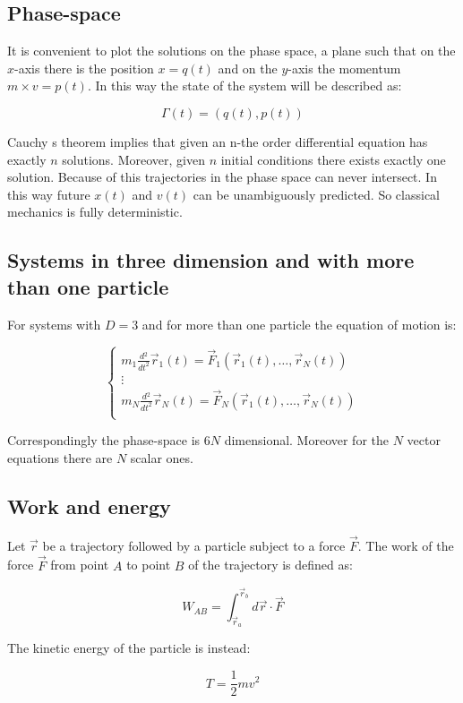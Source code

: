  \subsection{Phase-space}
  It is convenient to plot the solutions on the phase space, a plane such that on the $x$-axis there is the position $x=q(t)$ and on the $y$-axis the momentum $m\times v=p(t)$.
  In this way the state of the system will be described as:

  $$\Gamma(t) = (q(t),p(t))$$

  Cauchy s theorem implies that given an n-the order differential equation has exactly $n$ solutions.
  Moreover, given $n$ initial conditions there exists exactly one solution.
  Because of this trajectories in the phase space can never intersect.
  In this way future $x(t)$ and $v(t)$ can be unambiguously predicted.
  So classical mechanics is fully deterministic.

  \subsection{Systems in three dimension and with more than one particle}
  For systems with $D=3$ and for more than one particle the equation of motion is:

  $$\begin{cases}
    m_1 \frac{d{^2}}{d{t^2}}\vec{r}_1(t) = \vec{F}_1(\vec{r}_1(t), \dots,\vec{r}_N(t))\\
    \vdots\\
    m_N \frac{d{^2}}{d{t^2}}\vec{r}_N(t) = \vec{F}_N(\vec{r}_1(t), \dots,\vec{r}_N(t))\\
  \end{cases}$$

  Correspondingly the phase-space is $6N$ dimensional.
  Moreover for the $N$ vector equations there are $N$ scalar ones.

  \subsection{Work and energy}
  Let $\vec{r}$ be a trajectory followed by a particle subject to a force $\vec{F}$.
  The work of the force $\vec{F}$ from point $A$ to point $B$ of the trajectory is defined as:

  $$W_{AB} = \int_{\vec{r}_a}^{\vec{r}_b}d \vec{r}\cdot \vec{F}$$

  The kinetic energy of the particle is instead:

  $$T = \frac{1}{2}mv^2$$

